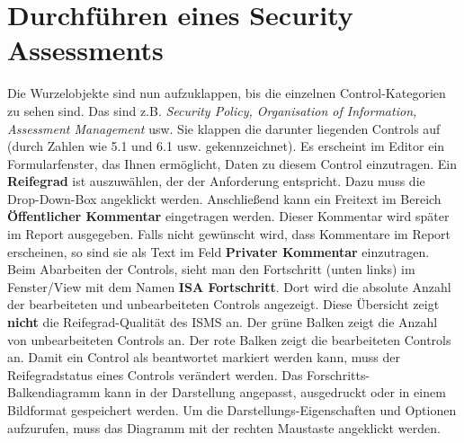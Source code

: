 \documentclass[a4paper,10pt]{book}
\begin{document}
\section{Durchführen eines Security Assessments}
Die Wurzelobjekte sind nun aufzuklappen, bis die einzelnen Control-Kategorien zu sehen sind. Das sind z.B. {\em Security Policy,
Organisation of Information, Assessment Management} usw. Sie klappen die darunter liegenden Controls auf (durch Zahlen wie 5.1 und 6.1 usw. gekennzeichnet).
Es erscheint im Editor ein Formularfenster, das Ihnen ermöglicht, Daten zu diesem Control einzutragen. Ein \textbf{Reifegrad} ist auszuwählen,
der der Anforderung entspricht. Dazu muss die Drop-Down-Box angeklickt werden. Anschließend kann ein Freitext im Bereich \textbf{Öffentlicher Kommentar}
eingetragen werden. Dieser Kommentar wird später im Report ausgegeben. Falls nicht gewünscht wird, dass Kommentare im Report erscheinen,
so sind sie als Text im Feld \textbf{Privater Kommentar} einzutragen.
\newline\\
Beim Abarbeiten der Controls, sieht man den Fortschritt (unten links) im Fenster/View mit dem Namen \textbf{ISA Fortschritt}.
Dort wird die absolute Anzahl der bearbeiteten und unbearbeiteten Controls angezeigt. Diese Übersicht zeigt \textbf{nicht} die Reifegrad-Qualität des ISMS an.
Der grüne Balken zeigt die Anzahl von unbearbeiteten Controls an. Der rote Balken zeigt die bearbeiteten Controls an. Damit ein Control als beantwortet markiert werden kann,
muss der Reifegradstatus eines Controls verändert werden. Das Forschritts-Balkendiagramm kann in der Darstellung angepasst, ausgedruckt oder in einem Bildformat gespeichert werden.
Um die Darstellungs-Eigenschaften und Optionen aufzurufen, muss das Diagramm mit der rechten Maustaste angeklickt werden.
\end{document}
